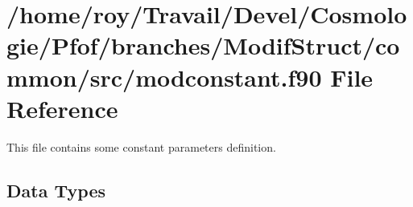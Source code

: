 \hypertarget{modconstant_8f90}{\section{/home/roy/\-Travail/\-Devel/\-Cosmologie/\-Pfof/branches/\-Modif\-Struct/common/src/modconstant.f90 File Reference}
\label{modconstant_8f90}
}


This file contains some constant parameters definition.  


\subsection*{Data Types}
